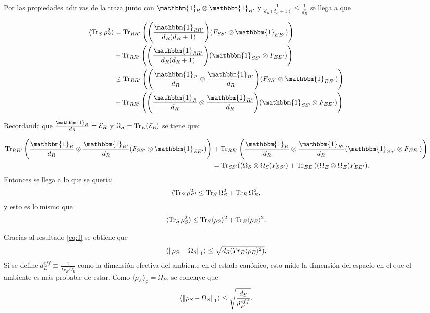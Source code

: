 Por las propiedades aditivas de la traza junto con $\mathbbm{1}_{R} \otimes \mathbbm{1}_{R'}$  y $\frac{1}{d_{R}(d_{R}+1)} \le \frac{1}{d_{R}^{2}}$ se llega a que

\begin{align*}
\langle \Tr_{S} \rho_{S}^2 \rangle &= \Tr_{RR'} \Bigg( \Bigg( \frac{\mathbbm{1}_{RR'}}{d_{R}(d_{R}+1)} \Bigg) (F_{SS'} \otimes \mathbbm{1}_{EE'})  \Bigg) \\
\qquad  &+ \Tr_{RR'} \Bigg( \Bigg( \frac{\mathbbm{1}_{RR'}}{d_{R}(d_{R}+1)} \Bigg) (\mathbbm{1}_{SS'} \otimes F_{EE'} )  \Bigg)\\ 
&\leq \Tr_{RR'} \Bigg( \Bigg( \frac{\mathbbm{1}_{R}}{d_{R}} \otimes  \frac{\mathbbm{1}_{R'}}{d_{R}}  \Bigg) (F_{SS'} \otimes \mathbbm{1}_{EE'})  \Bigg)\\
\qquad &+ \Tr_{RR'} \Bigg( \Bigg( \frac{\mathbbm{1}_{R}}{d_{R}} \otimes  \frac{\mathbbm{1}_{R'}}{d_{R}}  \Bigg) (\mathbbm{1}_{SS'} \otimes F_{EE'} )  \Bigg)
\end{align*}
	
Recordando que $\frac{\mathbbm{1}_{R}}{d_{R}}= \mathcal{E}_{R}$ y $\Omega_{S}=\Tr_{E}(\mathcal{E}_{R})$ se tiene que:

\begin{align*}
\Tr_{RR'}\Bigg(\frac{\mathbbm{1}_{R}}{d_{R}} \otimes \frac{\mathbbm{1}_{R'}}{d_{R}} (F_{SS'} \otimes 		\mathbbm{1}_{EE'}) \Bigg) &+ \Tr_{RR'}\Bigg(\frac{\mathbbm{1}_{R}}{d_{R}} \otimes \frac{\mathbbm{1}_{R'}}{d_{R}} (\mathbbm{1}_{SS'}\otimes 	F_{EE'}) \Bigg) \notag \\
&= \Tr_{SS'}((\Omega_{S} \otimes \Omega_{S})F_{SS'}) + \Tr_{EE'}((\Omega_{E} \otimes \Omega_{E})F_{EE'}).
\end{align*}
Entonces se llega a lo que se quería:	
\begin{equation}
\langle \Tr_{S} \rho_{S}^{2} \rangle \le \Tr_{S} \Omega_{S}^{2} +\Tr_{E} \Omega_{E}^{2},
\end{equation}
y esto es lo mismo que 
\begin{equation}
\langle \Tr_{S} \rho_{S}^{2} \rangle \le \Tr_{S} \langle \rho_{S} \rangle ^{2}  + \Tr_{E} \langle \rho_{E}\rangle^{2}.
\end{equation}

Gracias al resultado \ref{eq:0} se obtiene que
\begin{equation}
\langle \norm{\rho_{S} -\Omega_{S}}_{1} \rangle \le \sqrt{d_{S}(Tr_{E} \langle \rho_{E} \rangle^{2})}.
\end{equation}
Si se define $d_{E}^{eff} \equiv \frac{1}{Tr_{E} \Omega_{E}^{2}}$ como la dimensión efectiva del ambiente en el estado canónico, esto mide la dimensión del espacio en el que el ambiente es más probable de estar. Como $\langle \rho_{E} \rangle_{\phi} = \Omega_{E}$, se concluye que 
\begin{equation}
\langle \norm{\rho_{S} -\Omega_{S}}_{1} \rangle \le \sqrt{\frac{d_{S}}{d_{E}^{eff}}}.
\end{equation}

